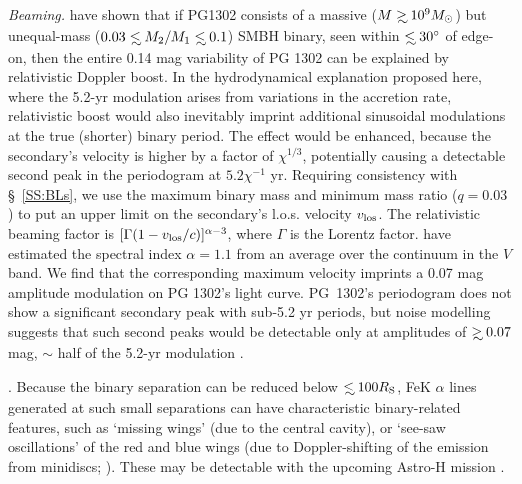 {\em Beaming.} 
\citet{PG1302Nature:2015b} have shown that if PG1302 consists of
a massive ($M\gsim 10^{9} \Msun$) but unequal-mass ($0.03 \lsim
M_2/M_1 \lsim 0.1$) SMBH binary, seen within $\lsim 30^{\circ}$ of
edge-on, then the entire 0.14 mag variability of PG 1302 can be
explained by relativistic Doppler boost.  In the hydrodynamical
explanation proposed here, where the 5.2-yr modulation arises from
variations in the accretion rate, relativistic boost would also
inevitably imprint additional sinusoidal modulations at the true
(shorter) binary period. The effect would be enhanced, because the
secondary's velocity is higher by a factor of $\chi^{1/3}$,
potentially causing a detectable second peak in the periodogram at
$5.2\chi^{-1}$ yr.  Requiring consistency with \S~\ref{SS:BLs}, we
use the maximum binary mass and minimum mass ratio ($q=0.03$) to put an
upper limit on the secondary's l.o.s. velocity $v_{\rm{los}}$.
The relativistic beaming factor is
$[\Gamma(1-v_{\rm{los}}/c)]^{\alpha-3}$, where $\Gamma$ is the Lorentz
factor. \citet{PG1302Nature:2015b} have estimated the spectral index $\alpha=1.1$
from an average over the continuum in the $V$ band.  We find that the
corresponding maximum velocity imprints a 0.07 mag amplitude
modulation on PG 1302's light curve. PG~1302's periodogram does not
show a significant secondary peak with sub-5.2 yr periods, but noise
modelling suggests that such second peaks would be detectable only at
amplitudes of $\gsim0.07$mag, $\sim$ half of the 5.2-yr modulation
\citep[][see the next section]{PG1302-Maria}.   



. Because the binary separation can
be reduced below $\lsim 100 R_{\rm{S}}$, FeK $\alpha$ lines generated at such
small separations can have characteristic binary-related features,
such as `missing wings' (due to the central cavity), or `see-saw
oscillations' of the red and blue wings (due to Doppler-shifting of
the emission from minidiscs; \citealt{McKFeZoltan:2013}).  These may be
detectable with the upcoming Astro-H mission \citep{AstroH:2014}.





